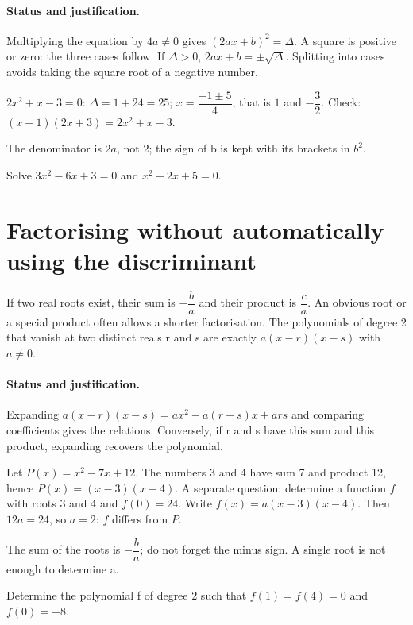\paragraph{Status and justification.} Multiplying the equation by $4a\ne0$ gives $(2ax+b)^2=\Delta$. A square is positive or zero: the three cases follow. If $\Delta>0$, $2ax+b=\pm\sqrt\Delta$. Splitting into cases avoids taking the square root of a negative number.
\begin{example}$2x^2+x-3=0$: $\Delta=1+24=25$; $x=\dfrac{-1\pm5}{4}$, that is $1$ and $-\dfrac{3}{2}$. Check: $(x-1)(2x+3)=2x^2+x-3$.\end{example}\label{C02-EX2}
\begin{pitfall}The denominator is $2a$, not 2; the sign of b is kept with its brackets in $b^2$.\end{pitfall}
\begin{application}Solve $3x^2-6x+3=0$ and $x^2+2x+5=0$.\end{application}\label{C02-AP2}
\section{Factorising without automatically using the discriminant}\label{C02-U3}
\begin{keypoint}
If two real roots exist, their sum is $-\dfrac{b}{a}$ and their product is $\dfrac{c}{a}$. An obvious root or a special product often allows a shorter factorisation. The polynomials of degree 2 that vanish at two distinct reals r and s are exactly $a(x-r)(x-s)$ with $a\ne0$.
\end{keypoint}
\paragraph{Status and justification.} Expanding $a(x-r)(x-s)=ax^2-a(r+s)x+ars$ and comparing coefficients gives the relations. Conversely, if r and s have this sum and this product, expanding recovers the polynomial.
\begin{example}Let $P(x)=x^2-7x+12$. The numbers 3 and 4 have sum 7 and product 12, hence $P(x)=(x-3)(x-4)$. A separate question: determine a function $f$ with roots 3 and 4 and $f(0)=24$. Write $f(x)=a(x-3)(x-4)$. Then $12a=24$, so $a=2$: $f$ differs from $P$.\end{example}\label{C02-EX3}
\begin{pitfall}The sum of the roots is $-\dfrac{b}{a}$; do not forget the minus sign. A single root is not enough to determine a.\end{pitfall}
\begin{application}Determine the polynomial f of degree 2 such that $f(1)=f(4)=0$ and $f(0)=-8$.\end{application}\label{C02-AP3}
